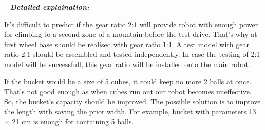    \newline
  \textit{\textbf{Detailed explaination:}}
  \begin{enumerate*}
  	\item It's difficult to predict if the gear ratio 2:1 will provide robot with enough power for climbing to a second zone of a mountain before the test drive. That's why at first wheel base should be realised with gear ratio 1:1. A test model with gear ratio 2:1 should be assembled and tested independently. In case the testing of 2:1 model will be successfull, this gear ratio will be installed onto the main robot.
  	\begin{figure}[H]
  		\begin{minipage}[h]{1\linewidth}
  		  \caption{}
  		\end{minipage}
  	\end{figure}
  	
  	\item If the bucket would be a size of 5 cubes, it could keep no more 2 balls at once. That's not good enough as when cubes run out our robot becomes uneffective. So, the bucket's capacity should be improved. The possible solution is to improve the length with saving the prior width. For example, bucket with parameters 13 $\times$ 21 cm is enough for containing 5 balls.
  	\begin{figure}[H]
  		\begin{minipage}[h]{1\linewidth}
  		  \caption{}
  		\end{minipage}
  	\end{figure}
  	

\end{enumerate*}
